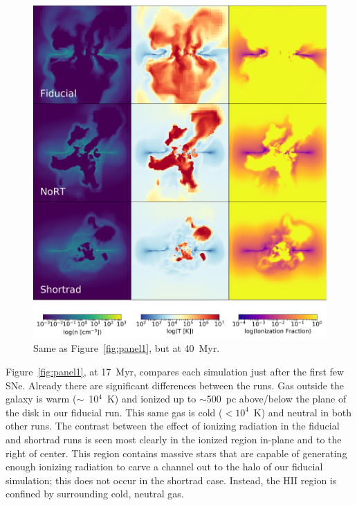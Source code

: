 \documentclass[twocolumn]{aastex62}
\begin{document}
\begin{figure}
\centering
\includegraphics[width=0.99\linewidth]{DD0160_fiducial_shortrad_nort}
\caption{Same as Figure~\ref{fig:panel1}, but at 40~Myr.}
\label{fig:panel2}
\end{figure}

Figure~\ref{fig:panel1}, at 17~Myr, compares each simulation just after the first few SNe. Already there are significant differences between the runs. Gas outside the galaxy is warm ($\sim$~10$^{4}$~K) and ionized up to $\sim$500~pc above/below the plane of the disk in our fiducial run. This same gas is cold ($<10^4$~K) and neutral in both other runs. The contrast between the effect of ionizing radiation in the fiducial and shortrad runs is seen most clearly in the ionized region in-plane and to the right of center. This region contains massive stars that are capable of generating enough ionizing radiation to carve a channel out to the halo of our fiducial simulation; this does not occur in the shortrad case. Instead, the HII region is confined by surrounding cold, neutral gas. 
\end{document}

